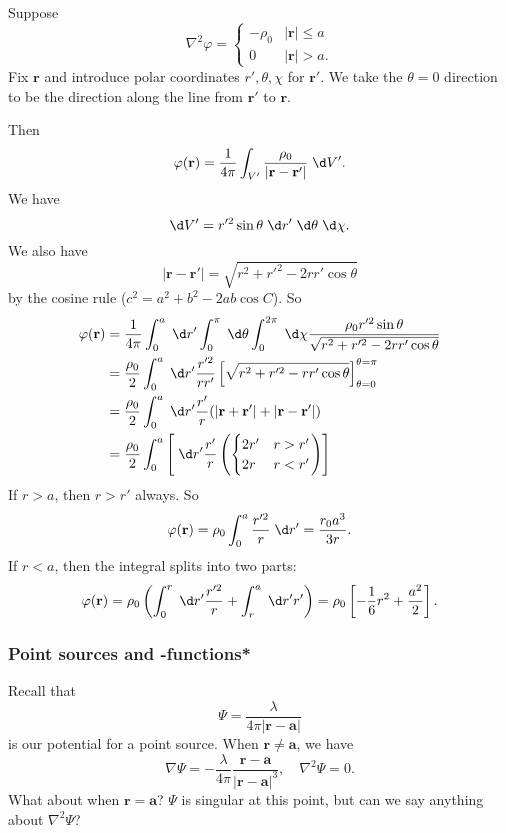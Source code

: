 \documentclass[a4paper]{article}
\begin{document}
\begin{eg}
  Suppose
  \[
    \nabla^2 \varphi =
    \begin{cases}
      -\rho_0 & |\mathbf{r}| \leq a\\
      0 & |\mathbf{r}| > a.
    \end{cases}
  \]
  Fix $\mathbf{r}$ and introduce polar coordinates $r', \theta, \chi$ for $\mathbf{r}'$. We take the $\theta = 0$ direction to be the direction along the line from $\mathbf{r}'$ to $\mathbf{r}$.

  Then
  \[
    \varphi(\mathbf{r}) = \frac{1}{4\pi}\int_{V'}\frac{\rho_0}{|\mathbf{r} - \mathbf{r}'|}\;\d V'.
  \]
  We have
  \[
    \d V' = r'^2 \sin \theta\;\d r'\;\d \theta\;\d \chi.
  \]
  We also have
  \[
    |\mathbf{r} - \mathbf{r}'| = \sqrt{r^2 + r'^2 - 2rr'\cos \theta}
  \]
  by the cosine rule ($c^2 = a^2 + b^2 - 2ab\cos C$). So
  \begin{align*}
    \varphi(\mathbf{r}) &= \frac{1}{4\pi}\int_0^a \;\d r'\int_0^\pi \;\d \theta \int_0^{2\pi}\;\d \chi \frac{\rho_0 r'^2 \sin \theta}{\sqrt{r^2 + r'^2 - 2rr'\cos \theta}}\\
    &= \frac{\rho_0}{2}\int_0^a \;\d r' \frac{r'^2}{rr'}\left[\sqrt{r^2 + r'^2 - rr'\cos \theta}\right]^{\theta = \pi}_{\theta = 0}\\
    &= \frac{\rho_0}{2}\int_0^a \;\d r' \frac{r'}{r}(|\mathbf{r} + \mathbf{r}'| + |\mathbf{r} - \mathbf{r}'|)\\
    &= \frac{\rho_0}{2}\int_0^a\left[ \;\d r' \frac{r'}{r}\left(
      \begin{cases}
        2r' & r > r'\\
        2r & r < r'
    \end{cases}\right)\right]
  \end{align*}
  If $r > a$, then $r > r'$ always. So
  \[
    \varphi(\mathbf{r}) = \rho_0 \int_0^a \frac{r'^2}{r}\;\d r' = \frac{r_0 a^3}{3r}.
  \]
  If $r < a$, then the integral splits into two parts:
  \[
    \varphi(\mathbf{r}) = \rho_0\left(\int_0^r \;\d r' \frac{r'^2}{r} + \int_r^a \;\d r' r'\right) = \rho_0\left[-\frac{1}{6}r^2 + \frac{a^2}{2}\right].
  \]
\end{eg}

\subsubsection{Point sources and -functions*}
Recall that
\[
  \Psi = \frac{\lambda}{4\pi |\mathbf{r} - \mathbf{a}|}
\]
is our potential for a point source. When $\mathbf{r}\not = \mathbf{a}$, we have
\[
  \nabla \Psi = -\frac{\lambda}{4\pi}\frac{\mathbf{r} - \mathbf{a}}{|\mathbf{r} - \mathbf{a}|^3},\quad\nabla^2\Psi = 0.
\]
What about when $\mathbf{r} = \mathbf{a}$? $\Psi$ is singular at this point, but can we say anything about $\nabla^2 \Psi$?
\end{document}
